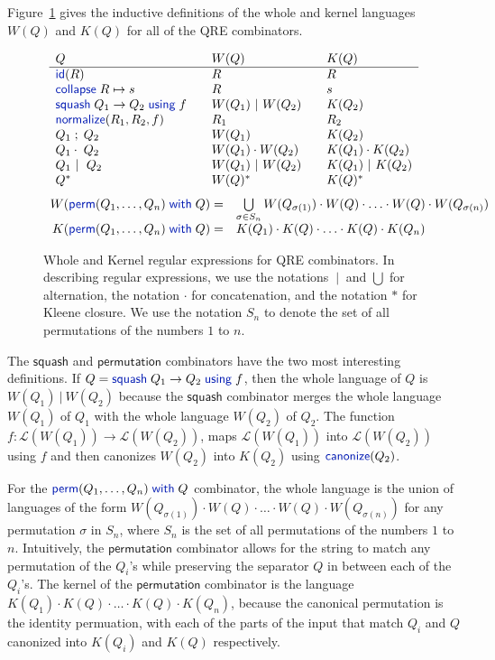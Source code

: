 \documentclass[acmsmall,screen]{acmart}
\newcommand{\kw}[1]{\textcolor{dkblue}{\ensuremath{\mathsf{#1}}}}
\newcommand{\collapse}[2]{\ensuremath{\kw{collapse} \; #1 \mapsto #2}}
\newcommand{\squash}[3]{\ensuremath{\kw{squash} \; #1 \rightarrow #2\; \kw{using} \; #3}}
\newcommand{\perm}[2]{\ensuremath{\kw{perm}(#1)\; \kw{with}\; #2}}
\newcommand{\normalize}[3]{\ensuremath{\kw{normalize}(#1, #2, #3)}}
\newcommand{\sep}{\ensuremath{\ | \ }}
\newcommand{\canonize}{\ensuremath{\kw{canonize}}}
\newcommand{\id}{\ensuremath{\kw{id}}}
\begin{document}
Figure~\ref{fig:wk} gives the inductive definitions of the whole and
kernel languages $W(Q)$ and $K(Q)$ for all of the QRE combinators.
\begin{figure}[t]
\centering
\[
\begin{array}{l@{\quad\quad}l@{\quad\quad}l}

Q & W(Q) & K(Q) \\ \hline
\id(R) & R & R \\
\collapse{R}{s} & R & s \\
\squash{Q_1}{Q_2}{f} & W(Q_1) \sep W(Q_2) & K(Q_2) \\
\normalize{R_1}{R_2}{f} & R_1 & R_2 \\
Q_1 \; ; \; Q_2 & W(Q_1) & K(Q_2) \\
Q_1 \cdot\; Q_2 & W(Q_1) \cdot W(Q_2) & K(Q_1) \cdot K(Q_2) \\
Q_1 \sep \; Q_2 & W(Q_1) \sep W(Q_2) & K(Q_1) \sep K(Q_2) \\
Q^* & W(Q)^* & K(Q)^* \\
\end{array}
\]
\[
\begin{array}{r@{\quad}l}
W( \perm{Q_1, \ldots, Q_n}{Q} ) = &
\bigcup \limits_{\sigma \in S_n} W(Q_{\sigma(1)}) \cdot W(Q) \cdot \ldots \cdot
W(Q) \cdot W(Q_{\sigma(n)})\\
K( \perm{Q_1, \ldots, Q_n}{Q} ) = & K(Q_1) \cdot K(Q) \cdot \ldots \cdot K(Q)
\cdot K(Q_n)
\end{array}
\]
\caption{Whole and Kernel regular expressions for QRE combinators. 
In describing regular expressions, we use the notations $\sep$ and $\bigcup$ for
alternation, the notation $\cdot$ for concatenation, and the notation
$*$ for Kleene closure.  
We use the notation $S_n$ to denote the set of all permutations of the
numbers $1$ to $n$.
}
\label{fig:wk}
\end{figure}
The \kw{squash} and \kw{permutation} combinators have the two most
interesting definitions. If $Q = \squash{Q_1}{Q_2}{f}$, then the whole language
of $Q$ is $W(Q_1) \sep W(Q_2)$ because the \kw{squash} combinator
merges the whole language $W(Q_1)$ of $Q_1$ with the whole language $W(Q_2)$ of $Q_2$.
The function $f : \mathcal{L}(W(Q_1)) \longrightarrow \mathcal{L}(W(Q_2))$,
maps $\mathcal{L}(W(Q_1))$ into $\mathcal{L}(W(Q_2))$ using $f$ and then
canonizes $W(Q_2)$ into $K(Q_2)$ using $\canonize(Q_2)$.

For the $\perm{Q_1, \ldots, Q_n}{Q}$ combinator, the whole language is the
union of languages of the form $W(Q_{\sigma(1)}) \cdot W(Q) \cdot \ldots \cdot
W(Q) \cdot W(Q_{\sigma(n)})$ for any permutation $\sigma$ in $S_n$, where
$S_n$ is the set of all permutations of the numbers $1$ to $n$. Intuitively,
the \kw{permutation} combinator allows for the string to match any
permutation of the $Q_i$'s while preserving the separator $Q$ in
between each of the $Q_i$'s. The kernel of the \kw{permutation} combinator
is the language $K(Q_1) \cdot K(Q) \cdot \ldots \cdot K(Q) \cdot K(Q_n)$,
because the canonical permutation is the identity permuation, with each of the
parts of the input that match $Q_i$ and $Q$ canonized into $K(Q_i)$ and $K(Q)$
respectively.
\end{document}
